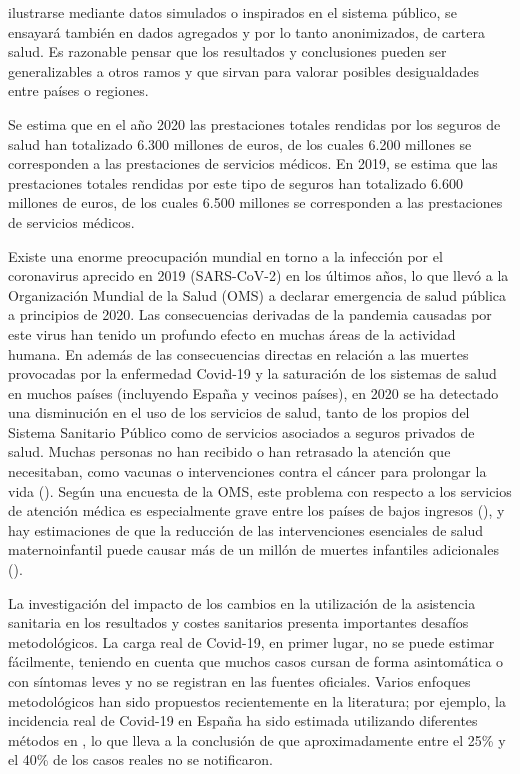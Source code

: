 \documentclass[12pt,twoside]{article} %
\begin{document}
ilustrarse mediante datos simulados o inspirados en el sistema público, se ensayará también en dados agregados y por lo tanto anonimizados, de cartera salud. Es razonable pensar que los resultados y conclusiones pueden ser generalizables a otros ramos y que sirvan para valorar posibles desigualdades entre países o regiones. 

Se estima que en el año 2020 las prestaciones totales rendidas por los seguros de salud han totalizado 6.300 millones de euros, de los cuales 6.200 millones se corresponden a las prestaciones de servicios médicos. En 2019, se estima que las prestaciones totales rendidas por este tipo de seguros han totalizado 6.600 millones de euros, de los cuales 6.500 millones se corresponden a las prestaciones de servicios médicos.

Existe una enorme preocupación mundial en torno a la infección por el coronavirus aprecido en 2019 (SARS-CoV-2)
en los últimos años, lo que llevó a la Organización Mundial de la Salud (OMS) a declarar
emergencia de salud pública a principios de 2020. Las consecuencias derivadas de la pandemia
causadas por este virus han tenido un profundo efecto en muchas áreas de la actividad humana. En
además de las consecuencias directas en relación a las muertes provocadas por la enfermedad Covid-19
y la saturación de los sistemas de salud en muchos países (incluyendo España y vecinos
países), en 2020 se ha detectado una disminución en el uso de los servicios de salud, tanto
de los propios del Sistema Sanitario Público como de servicios asociados a seguros privados de salud. Muchas personas no han recibido o han retrasado la atención que necesitaban, como vacunas o intervenciones contra el cáncer para prolongar la vida (\cite{baum_admissions_2020, mcdonald_early_2020, maringe_impact_2020}). Según una encuesta de la OMS, este problema con respecto a los servicios de atención médica es especialmente grave entre los países de bajos ingresos (\cite{noauthor_pulse_nodate}), y hay estimaciones de que la reducción de las intervenciones esenciales de salud maternoinfantil puede causar más de un millón de muertes infantiles adicionales (\cite{roberton_early_2020}). 

La investigación del impacto de los cambios en la utilización de la asistencia sanitaria en los resultados y costes sanitarios presenta importantes desafíos metodológicos. La carga real de Covid-19, en primer lugar, no se puede estimar fácilmente, teniendo en cuenta que muchos casos cursan de forma asintomática o con síntomas leves y no se registran en las fuentes oficiales. Varios enfoques metodológicos han sido propuestos recientemente en la literatura; por ejemplo, la incidencia real de Covid-19 en España ha sido estimada utilizando diferentes métodos en \cite{fernandez-fontelo_estimating_2020, morina_cumulated_2021}, lo que lleva a la conclusión de que aproximadamente entre el 25\% y el 40\% de los casos reales no se notificaron.
\end{document}
